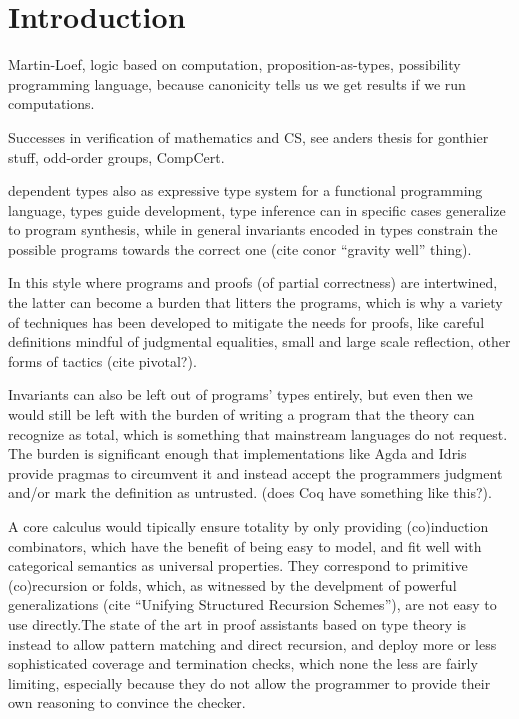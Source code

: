 \documentclass{book}
\begin{document}
\chapter{Introduction}

Martin-Loef, logic based on computation, proposition-as-types,
possibility programming language, because canonicity tells us we get results
if we run computations.

  Successes in verification of mathematics and CS, see anders thesis for gonthier stuff, odd-order groups, CompCert.

  dependent types also as expressive type system for a functional
  programming language, types guide development, type inference can in
  specific cases generalize to program synthesis, while in general
  invariants encoded in types constrain the possible programs towards
  the correct one (cite conor ``gravity well'' thing).

  In this style where programs and proofs (of partial correctness) are
  intertwined, the latter can become a burden that litters the
  programs, which is why a variety of techniques has been developed to
  mitigate the needs for proofs, like careful definitions mindful of judgmental equalities, small and
  large scale reflection, other forms of tactics (cite pivotal?).

  Invariants can also be left out of programs' types entirely, but
  even then we would still be left with the burden of writing a
  program that the theory can recognize as total, which is something
  that mainstream languages do not request. The burden is significant
  enough that implementations like Agda and Idris provide pragmas to
  circumvent it and instead accept the programmers judgment and/or
  mark the definition as untrusted. (does Coq have something like this?).

  A core calculus would tipically ensure totality by only providing
  (co)induction combinators, which have the benefit of being easy to
  model, and fit well with categorical semantics as universal
  properties.  They correspond to primitive (co)recursion or folds,
  which, as witnessed by the develpment of powerful generalizations
  (cite ``Unifying Structured Recursion Schemes''), are not easy to
  use directly.The state of the art in proof assistants based on type
  theory is instead to allow pattern matching and direct recursion,
  and deploy more or less sophisticated coverage and termination
  checks, which none the less are fairly limiting, especially because
  they do not allow the programmer to provide their own reasoning to
  convince the checker.
\end{document}
